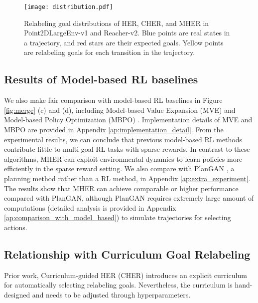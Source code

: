 \documentclass{article}
\begin{document}
\begin{figure}[t]
    \centering
    \texttt{[image: distribution.pdf]}
    \caption{Relabeling goal distributions of HER, CHER, and MHER in Point2DLargeEnv-v1 and Reacher-v2. Blue points are real states in a trajectory, and red stars are their expected goals. Yellow points are relabeling goals for each transition in the trajectory.}
    \label{fig:goals}
\end{figure}

\subsection{Results of Model-based RL baselines}
We also make fair comparison with model-based RL baselines in Figure \ref{fig:merge} (c) and (d), including Model-based Value Expansion (MVE) \cite{feinberg2018model} and Model-based Policy Optimization (MBPO) \cite{DBLP:conf/nips/JannerFZL19}. Implementation details of MVE and MBPO are provided in Appendix \ref{ap:implementation_detail}. From the experimental results, we can conclude that previous model-based RL methods contribute little to multi-goal RL tasks with sparse rewards. In contrast to these algorithms, MHER can exploit environmental dynamics to learn policies more efficiently in the sparse reward setting. We also compare with PlanGAN \cite{DBLP:conf/nips/CharlesworthM20}, a planning method rather than a RL method, in Appendix \ref{ap:extra_experiment}. 
The results show that MHER can achieve comparable or higher performance compared with PlanGAN, although PlanGAN requires extremely large amount of computations (detailed analysis is provided in Appendix \ref{ap:comparison_with_model_based}) to simulate trajectories for selecting actions.






\subsection{Relationship with Curriculum Goal Relabeling}
\label{sec:curriculum_relabeling}
Prior work, Curriculum-guided HER (CHER) \cite{fang2019curriculum} introduces an explicit curriculum for automatically selecting relabeling goals. Nevertheless, the curriculum is hand-designed and needs to be adjusted through hyperparameters. 
\end{document}
